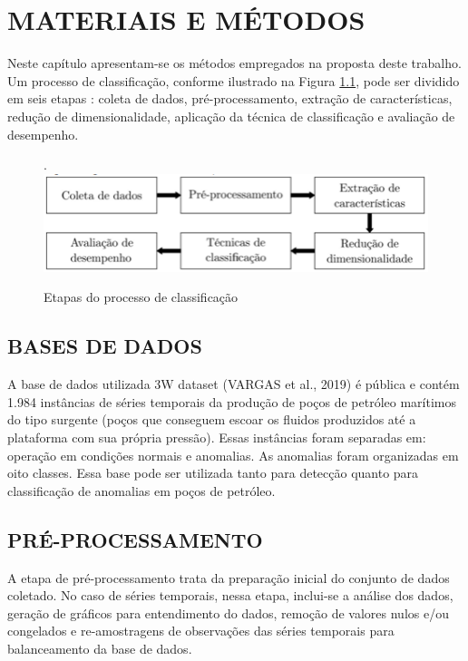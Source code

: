 \chapter[MATERIAIS E MÉTODOS]{MATERIAIS E MÉTODOS}

Neste capítulo apresentam-se os métodos empregados na proposta deste trabalho. Um processo de classificação, conforme ilustrado na Figura \ref{fig:4}, pode ser dividido em seis etapas \cite{kadhim2019survey}: coleta de dados, pré-processamento, extração de características, redução de dimensionalidade, aplicação da técnica de classificação e avaliação de desempenho.

\begin{figure}[H]
    \centering
    \caption{Etapas do processo de classificação}. 
    \label{fig:4}
 \includegraphics[width=120mm]{images/fig6.png}
\end{figure}

\section{BASES DE DADOS}
A base de dados utilizada 3W dataset (VARGAS et al., 2019) é pública e contém 1.984
instâncias de séries temporais da produção de poços de petróleo marítimos do tipo surgente
(poços que conseguem escoar os fluidos produzidos até a plataforma com sua própria
pressão). Essas instâncias foram separadas em: operação em condições normais e anomalias.
As anomalias foram organizadas em oito classes. Essa base pode ser utilizada tanto para
detecção quanto para classificação de anomalias em poços de petróleo.


\section{PRÉ-PROCESSAMENTO}
A etapa de pré-processamento trata da preparação inicial do conjunto de dados coletado. No
caso de séries temporais, nessa etapa, inclui-se a análise dos dados, geração de gráficos para
entendimento do dados, remoção de valores nulos e/ou congelados e re-amostragens de
observações das séries temporais para balanceamento da base de dados.

